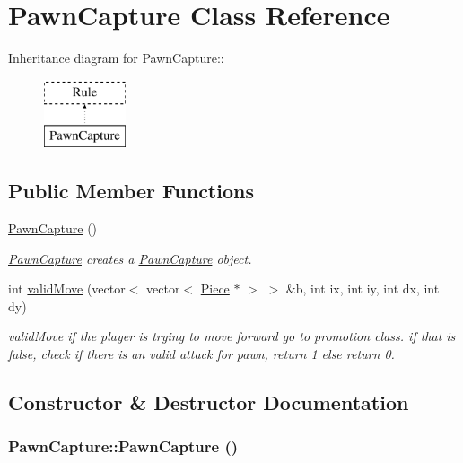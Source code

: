 \hypertarget{classPawnCapture}{
\section{PawnCapture Class Reference}
\label{classPawnCapture}
}
Inheritance diagram for PawnCapture::\begin{figure}[H]
\begin{center}
\leavevmode
\includegraphics[height=2cm]{classPawnCapture}
\end{center}
\end{figure}
\subsection*{Public Member Functions}
\begin{DoxyCompactItemize}
\item 
\hyperlink{classPawnCapture_a1d47980f9be9650f3d4201d417aaaec2}{PawnCapture} ()
\begin{DoxyCompactList}\small\item\em \hyperlink{classPawnCapture}{PawnCapture} creates a \hyperlink{classPawnCapture}{PawnCapture} object. \item\end{DoxyCompactList}\item 
int \hyperlink{classPawnCapture_afa1faa171cb70974f46add5989c3f373}{validMove} (vector$<$ vector$<$ \hyperlink{classPiece}{Piece} $\ast$ $>$ $>$ \&b, int ix, int iy, int dx, int dy)
\begin{DoxyCompactList}\small\item\em validMove if the player is trying to move forward go to promotion class. if that is false, check if there is an valid attack for pawn, return 1 else return 0. \item\end{DoxyCompactList}\end{DoxyCompactItemize}


\subsection{Constructor \& Destructor Documentation}
\hypertarget{classPawnCapture_a1d47980f9be9650f3d4201d417aaaec2}{
\subsubsection[{PawnCapture}]{\setlength{\rightskip}{0pt plus 5cm}PawnCapture::PawnCapture ()}}
\label{classPawnCapture_a1d47980f9be9650f3d4201d417aaaec2}


